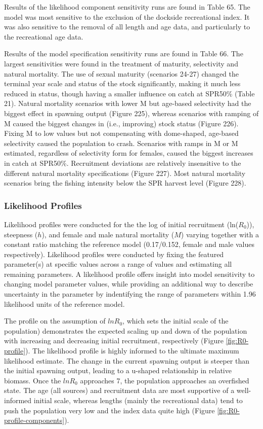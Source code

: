 \documentclass[11pt,
  english,
  letterpaper,
]{article}
\begin{document}
Results of the likelihood component sensitivity runs are found in Table 65. The model was most sensitive to the exclusion of the dockside recreational index. It was also sensitive to the removal of all length and age data, and particularly to the recreational age data.

Results of the model specification sensitivity runs are found in Table 66. The largest sensitivities were found in the treatment of maturity, selectivity and natural mortality. The use of sexual maturity (scenarios 24-27) changed the terminal year scale and status of the stock significantly, making it much less reduced in status, though having a smaller influence on catch at SPR50\% (Table 21). Natural mortality scenarios with lower M but age-based selectivity had the biggest effect in spawning output (Figure 225), whereas scenarios with ramping of M caused the biggest changes in (i.e., improving) stock status (Figure 226). Fixing M to low values but not compensating with dome-shaped, age-based selectivity caused the population to crash. Scenarios with ramps in M or M estimated, regardless of selectivity form for females, caused the biggest increases in catch at SPR50\%. Recruitment deviations are relatively insensitive to the different natural mortality specifications (Figure 227). Most natural mortality scenarios bring the fishing intensity below the SPR harvest level (Figure 228).

\hypertarget{likelihood-profiles}{%
\subsubsection{Likelihood Profiles}\label{likelihood-profiles}}

Likelihood profiles were conducted for the the log of initial recruitment (ln(\(R_0\))), steepness (\(h\)), and female and male natural mortality (\(M\)) varying together with a constant ratio matching the reference model (0.17/0.152, female and male values respectively). Likelihood profiles were conducted by fixing the featured parameter(s) at specific values across a range of values and estimating all remaining parameters. A likelihood profile offers insight into model sensitivity to changing model parameter values, while providing an additional way to describe uncertainty in the parameter by indentifying the range of parameters within 1.96 likelihood units of the reference model.

The profile on the assumption of \(lnR_0\), which sets the initial scale of the population) demonstrates the expected scaling up and down of the population with increasing and decreasing initial recruitment, respectively (Figure \ref{fig:R0-profile}). The likelihood profile is highly informed to the ultimate maximum likelihood estimate. The change in the current spawning output is steeper than the initial spawning output, leading to a u-shaped relationship in relative biomass. Once the \(lnR_0\) approaches 7, the population approaches an overfished state. The age (all sources) and recruitment data are most supportive of a well-informed initial scale, whereas lengths (mainly the recreational data) tend to push the population very low and the index data quite high (Figure \ref{fig:R0-profile-components}).
\end{document}
